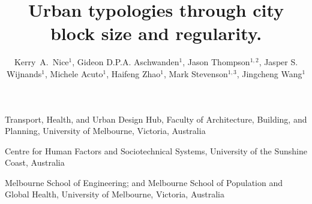 \documentclass{nature}
\title{Urban typologies through city block size and regularity.}
\author{Kerry~A.~Nice$^{1}$,
Gideon D.P.A. Aschwanden$^{1}$,
Jason Thompson$^{1,2}$,
Jasper S. Wijnands$^{1}$,
Michele Acuto$^{1}$,
Haifeng Zhao$^{1}$,
Mark Stevenson$^{1,3}$,
Jingcheng Wang$^{1}$}
\begin{document}
\maketitle

\begin{affiliations}
 \item Transport, Health, and Urban Design Hub, Faculty of Architecture, Building, and Planning, University of Melbourne, Victoria, Australia
 \item Centre for Human Factors and Sociotechnical Systems, University of the Sunshine Coast, Australia
 \item Melbourne School of Engineering; and Melbourne School of Population and Global Health, University of Melbourne, Victoria, Australia
\end{affiliations}
\end{document}

